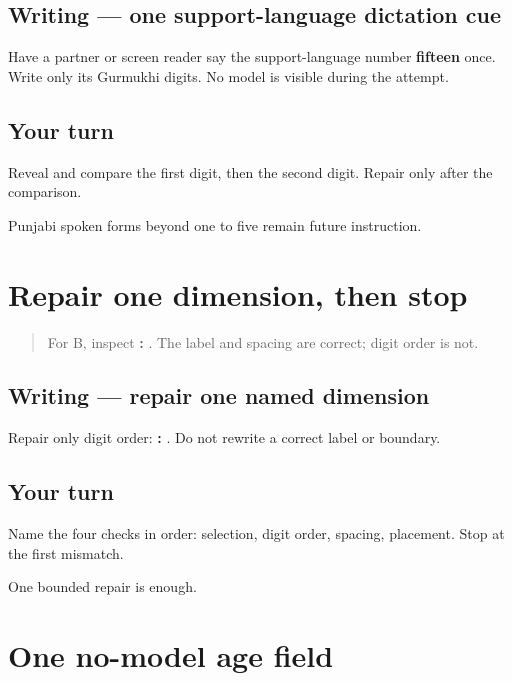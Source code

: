 \subsection*{Writing — one support-language dictation cue}
Have a partner or screen reader say the support-language number \textbf{fifteen} once. Write only its Gurmukhi digits. No model is visible during the attempt.

\subsection*{Your turn}
Reveal \textbf{} and compare the first digit, then the second digit. Repair only after the comparison.

\begin{tcolorbox}[breakable,colback=teal!4,colframe=teal!35!black,title={Before you move on}]
Punjabi spoken forms beyond one to five remain future instruction.
\end{tcolorbox}
\section[\texorpdfstring{\pa{ਉਮਰ}: \pa{੨੫} (age-field repair)}{ਉਮਰ: ੨੫ (age-field repair)}]{Repair one dimension, then stop}

\label{lesson:PA-W07-age-repair}



\begin{quote}
For B, inspect \textbf{: }. The label and spacing are correct; digit order is not.
\end{quote}

\subsection*{Writing — repair one named dimension}
Repair only digit order: \textbf{: }. Do not rewrite a correct label or boundary.

\subsection*{Your turn}
Name the four checks in order: selection, digit order, spacing, placement. Stop at the first mismatch.

\begin{tcolorbox}[breakable,colback=teal!4,colframe=teal!35!black,title={Before you move on}]
One bounded repair is enough.
\end{tcolorbox}
\section[\texorpdfstring{\pa{ਉਮਰ}: \_\_\_\_\_\_\_\_\_\_ (age field)}{ਉਮਰ: \_\_\_\_\_\_\_\_\_\_ (age field)}]{One no-model age field}


